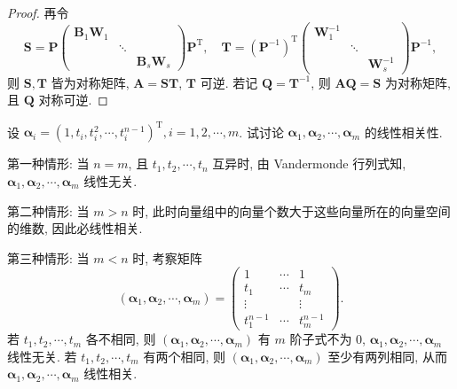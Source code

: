 \documentclass[../../main.tex]{subfiles}%
\begin{document}
\begin{proof}
再令
$$
\boldsymbol{S} = \boldsymbol{P}\begin{pmatrix}
\boldsymbol{B}_1\boldsymbol{W}_1 & & \\
& \ddots & \\
& & \boldsymbol{B}_s\boldsymbol{W}_s
\end{pmatrix}\boldsymbol{P}^{\mathrm{T}},
\quad
\boldsymbol{T} = (\boldsymbol{P}^{-1})^{\mathrm{T}}\begin{pmatrix}
\boldsymbol{W}_1^{-1} & & \\
& \ddots & \\
& & \boldsymbol{W}_s^{-1}
\end{pmatrix}\boldsymbol{P}^{-1},
$$
则 $\boldsymbol{S}, \boldsymbol{T}$ 皆为对称矩阵, $\boldsymbol{A} = \boldsymbol{S}\boldsymbol{T}$, $\boldsymbol{T}$ 可逆. 若记 $\boldsymbol{Q} = \boldsymbol{T}^{-1}$, 则 $\boldsymbol{A}\boldsymbol{Q} = \boldsymbol{S}$ 为对称矩阵, 且 $\boldsymbol{Q}$ 对称可逆.
\end{proof}

\begin{example}
设 $\boldsymbol{\alpha}_i = (1, t_i, t_i^2, \cdots, t_i^{n-1})^{\mathrm{T}}, i = 1, 2, \cdots, m$. 试讨论 $\boldsymbol{\alpha}_1, \boldsymbol{\alpha}_2, \cdots, \boldsymbol{\alpha}_m$ 的线性相关性.
\end{example}
\begin{solution}
第一种情形: 当 $n = m$, 且 $t_1, t_2, \cdots, t_n$ 互异时, 由 Vandermonde 行列式知, $\boldsymbol{\alpha}_1, \boldsymbol{\alpha}_2, \cdots, \boldsymbol{\alpha}_m$ 线性无关.

第二种情形: 当 $m > n$ 时, 此时向量组中的向量个数大于这些向量所在的向量空间的维数, 因此必线性相关.

第三种情形: 当 $m < n$ 时, 考察矩阵
$$
\left( \boldsymbol{\alpha}_1, \boldsymbol{\alpha}_2, \cdots, \boldsymbol{\alpha}_m \right) = \begin{pmatrix}
1 & \cdots & 1 \\
t_1 & \cdots & t_m \\
\vdots & & \vdots \\
t_1^{n-1} & \cdots & t_m^{n-1}
\end{pmatrix}.
$$
若 $t_1, t_2, \cdots, t_m$ 各不相同, 则 $\left( \boldsymbol{\alpha}_1, \boldsymbol{\alpha}_2, \cdots, \boldsymbol{\alpha}_m \right)$ 有 $m$ 阶子式不为 $0$, $\boldsymbol{\alpha}_1, \boldsymbol{\alpha}_2, \cdots, \boldsymbol{\alpha}_m$ 线性无关. 若 $t_1, t_2, \cdots, t_m$ 有两个相同, 则 $\left( \boldsymbol{\alpha}_1, \boldsymbol{\alpha}_2, \cdots, \boldsymbol{\alpha}_m \right)$ 至少有两列相同, 从而 $\boldsymbol{\alpha}_1, \boldsymbol{\alpha}_2, \cdots, \boldsymbol{\alpha}_m$ 线性相关.

\end{solution}
\end{document}
